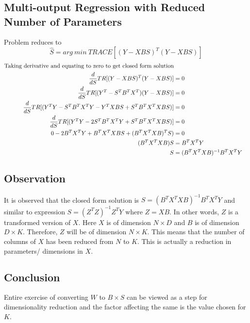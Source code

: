 \documentclass[a4paper,11pt]{article}
\newcommand\tab[1][1cm]{\hspace*{#1}}
\begin{document}
\begin{mlsolution}
\section*{Multi-output Regression with Reduced Number of Parameters}
\noindent \tab Problem reduces to 
$$
\hat{S} = arg\ min\ TRACE[(Y-XBS)^T(Y-XBS)]
$$
\begin{align*}
\textnormal{Taking derivative and equating to zero to get closed form solution}\\
\frac{d }{dS}TR[(Y-XBS)^T(Y-XBS)] &= 0\\
\frac{d }{dS}TR[(Y^T-S^TB^TX^T)(Y-XBS)]&= 0\\
\frac{d }{dS}TR[(Y^TY-S^TB^TX^TY-Y^TXBS+S^TB^TX^TXBS)]&= 0\\
\frac{d }{dS}TR[(Y^TY-2S^TB^TX^TY+S^TB^TX^TXBS)]&= 0\\
0-2B^TX^TY+B^TX^TXBS +(B^TX^TXB)^TS)&= 0\\
(B^TX^TXB)S&= B^TX^TY\\
S&= (B^TX^TXB)^{-1}B^TX^TY\\
\end{align*}
\subsection*{Observation}
\noindent \tab It is observed that the closed form solution is $S = (B^TX^TXB)^{-1}B^TX^TY$ and similar to expression $S = (Z^TZ)^{-1}Z^TY$ where $Z=XB$. In other words, $Z$ is a transformed version of $X$. Here  $X$ is of dimension $N \times D$ and $B$ is of dimension $D\times K$. Therefore, $Z$ will be of dimension $N \times K$. This means that the number of columns of $X$ has been reduced from $N$ to $K$. This is actually a reduction in parameters/ dimensions in $X$.
\subsection*{Conclusion}
\noindent \tab  Entire exercise of converting $W$ to $B\times S$ can be viewed as a step for dimensionality reduction and the factor affecting the same is the value chosen for $K$.
\end{mlsolution}
\end{document}
